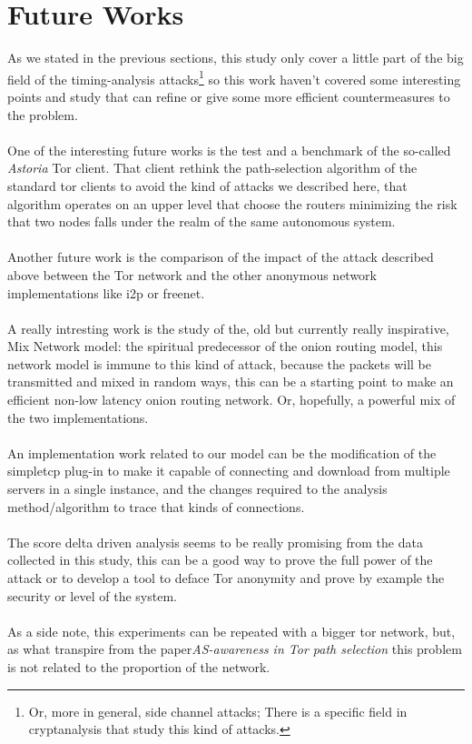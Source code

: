 \section{Future Works}
As we stated in the previous sections, this study only cover a little part of
the big field of the timing-analysis attacks\footnote{Or, more in general, side
channel attacks; There is a specific field in cryptanalysis that study this kind
of attacks.} so this work haven't covered some interesting points and study that
can refine or give some more efficient countermeasures to the problem.
\\\\
One of the interesting future works is the test and a benchmark
of the so-called \emph{Astoria}\cite{starov2015measuring} Tor client.
That client rethink
the path-selection algorithm of the standard tor clients to avoid the kind of
attacks we described here, that algorithm operates on an upper level that choose
the routers minimizing the risk that two nodes falls under the realm of the same
autonomous system.
\\\\
Another future work is the comparison of the impact of the attack described above
between the Tor network and the other anonymous network implementations like i2p or freenet.
\\\\
A really intresting work is the study of the, old but currently really inspirative,
Mix Network model\cite{chaum1981untraceable}: the spiritual predecessor
of the onion routing model, this network model is immune to this kind of
attack, because the packets will be transmitted and mixed in random ways,
this can be a starting point to make an efficient non-low latency onion routing
network. Or, hopefully, a powerful mix of the two implementations.
\\\\
An implementation work related to our model can be the modification
of the simpletcp plug-in to make it capable of connecting and download from
multiple servers in a single instance, and the changes
required to the analysis method/algorithm to trace that kinds of connections.
\\\\
The score delta driven analysis seems to be really promising from the data collected
in this study, this can be a good way to prove the full power of the attack or
to develop a tool to deface Tor anonymity and prove by example the security or
level of the system.
\\\\
As a side note, this experiments can be repeated with a bigger tor
network, but, as what transpire from the paper\emph{AS-awareness in Tor
path selection}\cite{edman2009awareness} this problem is not related to
the proportion of the network.
